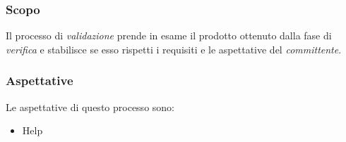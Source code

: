 			\subsubsection{Scopo}
				Il processo di \emph{validazione} prende in esame il prodotto ottenuto dalla fase di \emph{verifica} e stabilisce se esso rispetti i requisiti e le aspettative del \emph{committente}.
			\subsubsection{Aspettative}
				Le aspettative di questo processo sono:
					\begin{itemize}
						\item Help%
					\end{itemize}